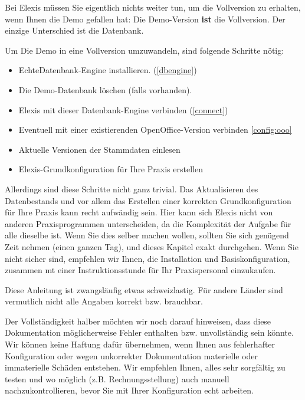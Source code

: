
\label{vollversion}
Bei Elexis müssen Sie eigentlich nichts weiter tun, um die Vollversion zu
erhalten, wenn Ihnen die Demo gefallen hat: Die Demo-Version \textbf{ist} die
Vollversion. Der einzige Unterschied ist die Datenbank.

Um Die Demo in eine Vollversion umzuwandeln, sind folgende Schritte nötig:
\begin{itemize}
  \item \glqq Echte\grqq{}Datenbank-Engine installieren. (\ref{dbengine})
  \item Die Demo-Datenbank löschen (falls vorhanden).
  \item Elexis mit dieser Datenbank-Engine verbinden (\ref{connect})
  \item Eventuell mit einer existierenden OpenOffice-Version verbinden \ref{config:ooo}
  \item Aktuelle Versionen der Stammdaten einlesen
  \item Elexis-Grundkonfiguration für Ihre Praxis erstellen
\end{itemize}
Allerdings sind diese Schritte nicht ganz trivial. Das Aktualisieren des
Datenbestands und vor allem das Erstellen einer korrekten Grundkonfiguration für
Ihre Praxis kann recht aufwändig sein. Hier kann sich Elexis nicht von anderen
Praxisprogrammen unterscheiden, da die Komplexität der Aufgabe für alle dieselbe
ist.
Wenn Sie dies selber machen wollen, sollten Sie sich genügend Zeit nehmen (einen
ganzen Tag), und dieses Kapitel exakt durchgehen. Wenn Sie nicht sicher sind,
empfehlen wir Ihnen, die Installation und Basiskonfiguration, zusammen mt einer
Instruktionsstunde für Ihr Praxispersonal einzukaufen.\par
Diese Anleitung ist zwangsläufig etwas schweizlastig. Für andere Länder sind vermutlich nicht alle Angaben korrekt bzw. brauchbar.
\bigskip

Der Vollständigkeit halber möchten wir noch darauf hinweisen, dass diese Dokumentation möglicherweise Fehler enthalten bzw. unvollständig sein könnte. Wir können keine Haftung dafür übernehmen, wenn Ihnen aus fehlerhafter Konfiguration oder wegen unkorrekter Dokumentation materielle oder immaterielle Schäden entstehen. Wir empfehlen Ihnen, alles sehr sorgfältig zu testen und wo möglich (z.B. Rechnungsstellung) auch manuell nachzukontrollieren, bevor Sie mit Ihrer Konfiguration \glqq echt\grqq{} arbeiten.
